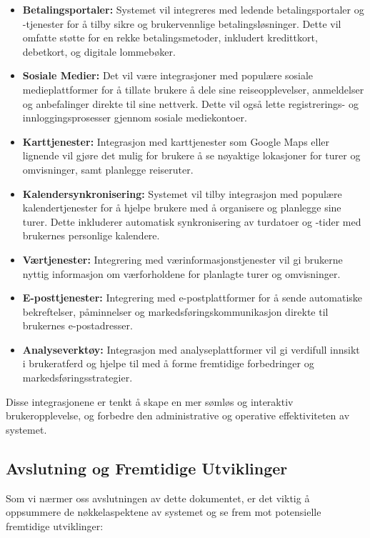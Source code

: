 \documentclass[../doc.tex]{subfiles}
\begin{document}
\begin{itemize}
    \item \textbf{Betalingsportaler:} Systemet vil integreres med ledende betalingsportaler og -tjenester for å tilby sikre og brukervennlige betalingsløsninger. 
    Dette vil omfatte støtte for en rekke betalingsmetoder, inkludert kredittkort, debetkort, og digitale lommebøker.

    \item \textbf{Sosiale Medier:} Det vil være integrasjoner med populære sosiale medieplattformer for å tillate brukere å dele sine reiseopplevelser, anmeldelser og anbefalinger direkte til sine nettverk. 
    Dette vil også lette registrerings- og innloggingsprosesser gjennom sosiale mediekontoer.

    \item \textbf{Karttjenester:} Integrasjon med karttjenester som Google Maps eller lignende vil gjøre det mulig for brukere å se nøyaktige lokasjoner for turer og omvisninger, samt planlegge reiseruter.

    \item \textbf{Kalendersynkronisering:} Systemet vil tilby integrasjon med populære kalendertjenester for å hjelpe brukere med å organisere og planlegge sine turer. 
    Dette inkluderer automatisk synkronisering av turdatoer og -tider med brukernes personlige kalendere.

    \item \textbf{Værtjenester:} Integrering med værinformasjonstjenester vil gi brukerne nyttig informasjon om værforholdene for planlagte turer og omvisninger.

    \item \textbf{E-posttjenester:} Integrering med e-postplattformer for å sende automatiske bekreftelser, påminnelser og markedsføringskommunikasjon direkte til brukernes e-postadresser.

    \item \textbf{Analyseverktøy:} Integrasjon med analyseplattformer vil gi verdifull innsikt i brukeratferd og hjelpe til med å forme fremtidige forbedringer og markedsføringsstrategier.
\end{itemize}

Disse integrasjonene er tenkt å skape en mer sømløs og interaktiv brukeropplevelse, og forbedre den administrative og operative effektiviteten av systemet.

\subsection{Avslutning og Fremtidige Utviklinger}
Som vi nærmer oss avslutningen av dette dokumentet, er det viktig å oppsummere de nøkkelaspektene av systemet og se frem mot potensielle fremtidige utviklinger:
\end{document}
